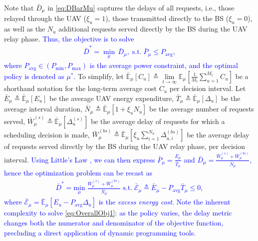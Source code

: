 \documentclass[12pt, draftcls, onecolumn]{IEEEtran}
\theoremstyle{plain}
\theoremstyle{definition}
\theoremstyle{remark}
\newcommand\hlt[1]{\textcolor{blue}{#1}}
\begin{document}
Note that $\bar{D}_{\mu}$ in \eqref{eq:DBarMu} captures the delays of all requests, i.e., those relayed through the UAV ($\xi_{u}{=}1$), those transmitted directly to the BS ($\xi_{u}{=}0$), as well as the $N_{u}$ additional requests served directly by the BS during the UAV relay phase. \hlt{Thus, the objective is to solve 
\begin{align}\label{eq:opt_prob_orig}
    \bar D^* = \min_{\mu} \, \bar{D}_{\mu}, \; \mathrm{s.t.} \; \bar P_{\mu} \leq P_{\mathrm{avg}},
\end{align}
where $P_{\mathrm{avg}}\in(P_{\min},P_{\max})$ is the average power constraint,
and the optimal policy is denoted as $\mu^*$.} To simplify, let $\bar{\mathbb{E}}_{\mu}[C_{u}]{\triangleq}\lim\limits_{t{\rightarrow}\infty}\mathbb{E}_{\mu}[\frac{1}{M_{t}}\sum_{u{=}1}^{M_{t}}C_{u}]$ be a shorthand notation for the long-term average cost $C_u$ per decision interval. Let $\bar{E}_{\mu}{\triangleq}\bar{\mathbb{E}}_{\mu}\left[E_{u}\right]$ be the average UAV energy expenditure, $\bar{T}_{\mu}{\triangleq}\bar{\mathbb{E}}_{\mu}\left[\Delta_{u}\right]$ be the average interval duration, $\bar{N}_{\mu}{\triangleq}\bar{\mathbb{E}}_{\mu}[1+\xi_{u}N_{u}]$ be the average number of requests served, $\bar{W}_{\mu}^{(s)}{\triangleq}\bar{\mathbb{E}}_{\mu}[\Delta_{u}^{(s)}]$ be the average delay of requests for which a scheduling decision is made, $\bar{W}_{\mu}^{(bs)}{\triangleq}\bar{\mathbb{E}}_{\mu}[\xi_{u}\sum_{i{=}1}^{N_{u}}\Delta_{u,i}^{(bs)}]$ be the average delay of requests served directly by the BS during the UAV relay phase, per decision interval. \hlt{Using Little's Law \cite{LittlesLaw}, we  can then express $\bar{P}_{\mu}{=}\frac{\bar{E}_{\mu}}{\bar{T}_{\mu}}$ and $\bar{D}_{\mu}{=}\frac{\bar{W}_{\mu}^{(s)}+\bar{W}_{\mu}^{(bs)}}{\bar{N}_{\mu}}$, hence the optimization problem can be recast as
\begin{align}\label{eq:OverallObj1}
    \bar{D}^{*} = \underset{\mu}{\mathrm{min}} \; \frac{\bar{W}_{\mu}^{(s)} + \bar{W}_{\mu}^{(bs)}}{\bar{N}_{\mu}} \; \mathrm{s.t.} \; 
    \bar{\mathcal E}_\mu\triangleq
    \bar{E}_{\mu} - P_{\mathrm{avg}}\bar{T}_{\mu} \leq 0,
\end{align}
where $\bar{\mathcal E}_\mu{=}\bar{\mathbb{E}}_{\mu}[E_{u}{-}P_{\mathrm{avg}}\Delta_u]$ is the \emph{excess energy cost}.
Note the inherent complexity to solve \eqref{eq:OverallObj1}: as the policy varies, the delay metric changes both the numerator and denominator of the objective function, precluding a direct application of dynamic programming tools.}
\end{document}

